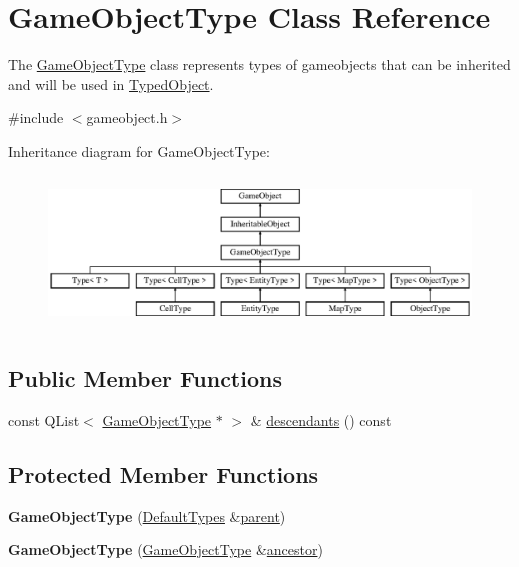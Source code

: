 \hypertarget{class_game_object_type}{\section{\-Game\-Object\-Type \-Class \-Reference}
\label{class_game_object_type}
}


\-The \hyperlink{class_game_object_type}{\-Game\-Object\-Type} class represents types of gameobjects that can be inherited and will be used in \hyperlink{class_typed_object}{\-Typed\-Object}.  




{\ttfamily \#include $<$gameobject.\-h$>$}

\-Inheritance diagram for \-Game\-Object\-Type\-:\begin{figure}[H]
\begin{center}
\leavevmode
\includegraphics[height=4.087591cm]{class_game_object_type}
\end{center}
\end{figure}
\subsection*{\-Public \-Member \-Functions}
\begin{DoxyCompactItemize}
\item 
const \-Q\-List$<$ \hyperlink{class_game_object_type}{\-Game\-Object\-Type} $\ast$ $>$ \& \hyperlink{class_game_object_type_a249afd48c30e0530a15c7bebf9f84d9b}{descendants} () const 
\end{DoxyCompactItemize}
\subsection*{\-Protected \-Member \-Functions}
\begin{DoxyCompactItemize}
\item 
\hypertarget{class_game_object_type_a7c2ad7a00f9240d2bf29db0ac3b1314f}{{\bfseries \-Game\-Object\-Type} (\hyperlink{class_default_types}{\-Default\-Types} \&\hyperlink{class_game_object_af3deaf39cde23c189765634e32e95bb4}{parent})}\label{class_game_object_type_a7c2ad7a00f9240d2bf29db0ac3b1314f}

\item 
\hypertarget{class_game_object_type_a9388a78893199c74f16edb92ae087dd2}{{\bfseries \-Game\-Object\-Type} (\hyperlink{class_game_object_type}{\-Game\-Object\-Type} \&\hyperlink{class_inheritable_object_a10eead70368227b7f15f44f91d234fa5}{ancestor})}\label{class_game_object_type_a9388a78893199c74f16edb92ae087dd2}

\end{DoxyCompactItemize}


